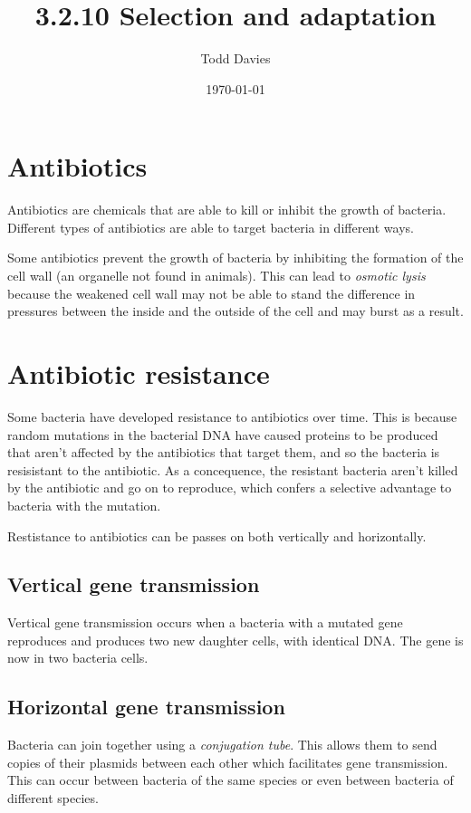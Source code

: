 \documentclass{article}
\author{Todd Davies}
\title{3.2.10 Selection and adaptation}
\date{\today}
\begin{document}
\lhead{\today}

\maketitle

\section{Antibiotics}
\thispagestyle{empty}

Antibiotics are chemicals that are able to kill or inhibit the growth of
bacteria. Different types of antibiotics are able to target bacteria in
different ways.

Some antibiotics prevent the growth of bacteria by inhibiting the formation of
the cell wall (an organelle not found in animals). This can lead to {\it osmotic
lysis} because the weakened cell wall may not be able to stand the difference in
pressures between the inside and the outside of the cell and may burst as a
result.

\section{Antibiotic resistance}

Some bacteria have developed resistance to antibiotics over time. This is
because random mutations in the bacterial DNA have caused proteins to be
produced that aren't affected by the antibiotics that target them, and so the
bacteria is resisistant to the antibiotic. As a concequence, the resistant
bacteria aren't killed by the antibiotic and go on to reproduce, which confers a
selective advantage to bacteria with the mutation.

Restistance to antibiotics can be passes on both vertically and horizontally.

\subsection{Vertical gene transmission}

Vertical gene transmission occurs when a bacteria with a mutated gene reproduces
and produces two new daughter cells, with identical DNA. The gene is now in two
bacteria cells.

\subsection{Horizontal gene transmission}

Bacteria can join together using a {\it conjugation tube}. This allows them to
send copies of their plasmids between each other which facilitates gene
transmission. This can occur between bacteria of the same species or even
between bacteria of different species.
\end{document}
